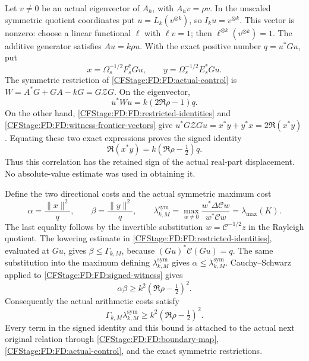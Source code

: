Let \(v\ne0\) be an actual eigenvector of \(A_h\), with
\(A_hv=\rho v\).  In the unscaled symmetric quotient coordinates put
\(u=L_k(v^{\otimes k})\), so \(I_ku=v^{\otimes k}\).
This vector is nonzero: choose a linear functional \(\ell\) with
\(\ell v=1\); then \(\ell^{\otimes k}(v^{\otimes k})=1\).
The additive generator satisfies \(Au=k\rho u\).  With the exact
positive number \(q=u^*Gu\), put
\begin{equation}
x=\Omega_s^{-1/2}F_s^*Gu,\qquad
y=\Omega_s^{-1/2}E_s^*Gu.
\tag{FD.41}\label{CFStage:FD:FD:witness-frontier-vectors}
\end{equation}
The symmetric restriction of \eqref{CFStage:FD:FD:actual-control} is
\(W=A^*G+GA-kG=G\mathcal ZG\).  On the eigenvector,
\[
u^*Wu=k(2\Re\rho-1)q.
\]
On the other hand, \eqref{CFStage:FD:FD:restricted-identities} and
\eqref{CFStage:FD:FD:witness-frontier-vectors} give
\(u^*G\mathcal ZGu=x^*y+y^*x=2\Re(x^*y)\).
Equating these two exact expressions proves the signed identity
\begin{equation}
\boxed{\Re(x^*y)=k(\Re\rho-\tfrac12)q.}
\tag{FD.42}\label{CFStage:FD:FD:signed-witness}
\end{equation}
Thus this correlation has the retained sign of the actual real-part
displacement.  No absolute-value estimate was used in obtaining it.

Define the two directional costs and the actual symmetric maximum cost
\begin{equation}
\alpha=\frac{\|x\|^2}{q},\qquad
\beta=\frac{\|y\|^2}{q},\qquad
\lambda_{k,M}^{\mathrm{sym}}
=\max_{w\ne0}\frac{w^*\Delta\mathcal Cw}{w^*\mathcal Cw}
=\lambda_{\max}(K).
\tag{FD.43}\label{CFStage:FD:FD:relative-costs}
\end{equation}
The last equality follows by the invertible substitution
\(w=\mathcal C^{-1/2}z\) in the Rayleigh quotient.  The lowering
estimate in \eqref{CFStage:FD:FD:restricted-identities}, evaluated at \(Gu\),
gives \(\beta\le\Gamma_{k,M}\), because
\((Gu)^*\mathcal C(Gu)=q\).  The same substitution into the
maximum defining \(\lambda_{k,M}^{\mathrm{sym}}\) gives
\(\alpha\le\lambda_{k,M}^{\mathrm{sym}}\).  Cauchy--Schwarz applied
to \eqref{CFStage:FD:FD:signed-witness} gives
\[
\alpha\beta\ge k^2(\Re\rho-\tfrac12)^2.
\]
Consequently the actual arithmetic costs satisfy
\begin{equation}
\boxed{\Gamma_{k,M}\lambda_{k,M}^{\mathrm{sym}}
\ge k^2(\Re\rho-\tfrac12)^2.}
\tag{FD.44}\label{CFStage:FD:FD:quadratic-cost}
\end{equation}
Every term in the signed identity and this bound is attached to the
actual next original relation through \eqref{CFStage:FD:FD:boundary-map},
\eqref{CFStage:FD:FD:actual-control}, and the exact symmetric restrictions.

